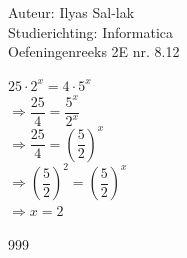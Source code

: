 \documentclass[a4paper]{article}
\begin{document}
\noindent \large Auteur: Ilyas Sal-lak \\
\noindent \large Studierichting: Informatica\\
\noindent \large Oefeningenreeks 2E nr. 8.12\\


\normalsize

$25 \cdot 2^x = 4 \cdot 5^x$ \\

$\Rightarrow \dfrac{25}{4} = \dfrac{5^x}{2^x}$ \\

$\Rightarrow \dfrac{25}{4} = \left(\dfrac{5}{2}\right)^x$ \\

$\Rightarrow \left(\dfrac{5}{2}\right)^2 = \left(\dfrac{5}{2}\right)^x$ \\

$\Rightarrow x = 2$

\begin{thebibliography}{999}
\end{thebibliography}
\end{document}
